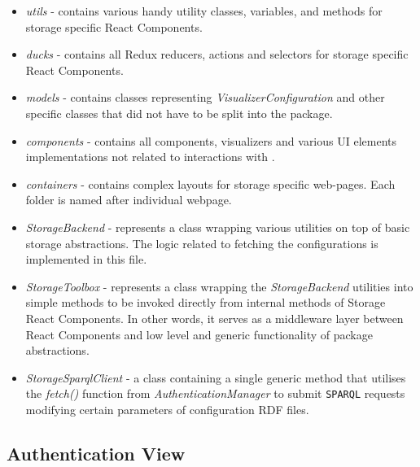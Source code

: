 \begin{itemize}
    \item \textit{utils} - contains various handy utility classes, variables, and methods for storage specific React Components.
    \item \textit{ducks} - contains all Redux reducers, actions and selectors for storage specific React Components. 
    \item \textit{models} - contains classes representing \textit{VisualizerConfiguration} and other \lpa{} specific classes that did not have to be split into the \lpas{} package.
    \item \textit{components} - contains all components, visualizers and various UI elements implementations not related to interactions with \solid{}.
    \item \textit{containers} - contains complex layouts for storage specific web-pages. Each folder is named after individual webpage.     
    \item \textit{StorageBackend} - represents a class wrapping various utilities on top of basic \lpas{} storage abstractions. The logic related to fetching the \lpa{} configurations is implemented in this file.
    \item \textit{StorageToolbox} - represents a class wrapping the \textit{StorageBackend} utilities into simple methods to be invoked directly from internal methods of Storage React Components. In other words, it serves as a middleware layer between React Components and low level and generic functionality of \lpas{} package abstractions.
    \item \textit{StorageSparqlClient} - a class containing a single generic method that utilises the \textit{fetch()} function from \textit{AuthenticationManager} to submit \texttt{SPARQL} requests modifying certain parameters of \lpa{} configuration RDF files. 
\end{itemize}

\subsection{Authentication View}
\label{sssec:authentication_view_implementation}

